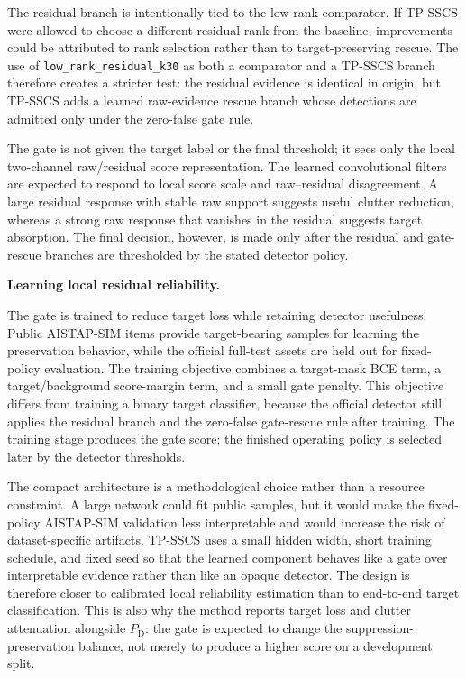 \documentclass[journal]{IEEEtran}
\begin{document}
The residual branch is intentionally tied to the low-rank comparator. If TP-SSCS were allowed to choose a different residual rank from the baseline, improvements could be attributed to rank selection rather than to target-preserving rescue. The use of \texttt{low\_rank\_residual\_k30} as both a comparator and a TP-SSCS branch therefore creates a stricter test: the residual evidence is identical in origin, but TP-SSCS adds a learned raw-evidence rescue branch whose detections are admitted only under the zero-false gate rule.

The gate is not given the target label or the final threshold; it sees only the local two-channel raw/residual score representation. The learned convolutional filters are expected to respond to local score scale and raw--residual disagreement. A large residual response with stable raw support suggests useful clutter reduction, whereas a strong raw response that vanishes in the residual suggests target absorption. The final decision, however, is made only after the residual and gate-rescue branches are thresholded by the stated detector policy.

\noindent\textbf{Learning local residual reliability.}

The gate is trained to reduce target loss while retaining detector usefulness. Public AISTAP-SIM items provide target-bearing samples for learning the preservation behavior, while the official full-test assets are held out for fixed-policy evaluation. The training objective combines a target-mask BCE term, a target/background score-margin term, and a small gate penalty. This objective differs from training a binary target classifier, because the official detector still applies the residual branch and the zero-false gate-rescue rule after training. The training stage produces the gate score; the finished operating policy is selected later by the detector thresholds.

The compact architecture is a methodological choice rather than a resource constraint. A large network could fit public samples, but it would make the fixed-policy AISTAP-SIM validation less interpretable and would increase the risk of dataset-specific artifacts. TP-SSCS uses a small hidden width, short training schedule, and fixed seed so that the learned component behaves like a gate over interpretable evidence rather than like an opaque detector. The design is therefore closer to calibrated local reliability estimation than to end-to-end target classification. This is also why the method reports target loss and clutter attenuation alongside $P_{\mathrm{D}}$: the gate is expected to change the suppression-preservation balance, not merely to produce a higher score on a development split.
\end{document}

